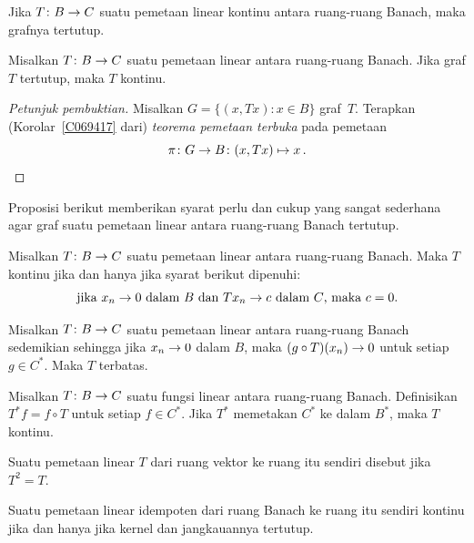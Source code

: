 \begin{exer} Jika $T\colon B \rightarrow C$ suatu pemetaan linear kontinu antara ruang-ruang Banach, maka grafnya tertutup.
\end{exer}

\begin{thm}\label{thm_CGT} Misalkan $T\colon B \rightarrow C$ suatu pemetaan linear antara ruang-ruang Banach.
Jika graf $T$ tertutup, maka $T$ kontinu.
\end{thm}

\begin{proof}[\emph{Petunjuk pembuktian}] Misalkan $G = \{(x,Tx)\colon x \in B\}$ graf~$T$. Terapkan
(Korolar~\ref{C069417} dari) \emph{teorema pemetaan terbuka} pada pemetaan
  \[ \pi\colon G \rightarrow B\colon (x,Tx) \mapsto x\,. \]
\ns \end{proof}

Proposisi berikut memberikan syarat perlu dan cukup yang sangat sederhana agar graf suatu pemetaan linear antara ruang-ruang Banach
tertutup.

\begin{prop}\label{prop_nasc_closed_graph} Misalkan $T\colon B \rightarrow C$ suatu pemetaan linear antara ruang-ruang Banach. Maka $T$
kontinu jika dan hanya jika syarat berikut dipenuhi:
   \[ \text{jika $x_n \rightarrow 0$ dalam $B$ dan $Tx_n \rightarrow c$ dalam $C$, maka $c = 0$.} \]
\end{prop}

\begin{prop} Misalkan $T \colon B \rightarrow C$ suatu pemetaan linear antara ruang-ruang Banach sedemikian sehingga jika
$x_n \rightarrow 0$ dalam $B$, maka $(g \circ T)(x_n) \rightarrow 0$ untuk setiap $g \in C^*$.  Maka $T$
terbatas.
\end{prop}

\begin{prop} Misalkan $T \colon B \rightarrow C$ suatu fungsi linear antara ruang-ruang Banach. Definisikan
$T^*f = f \circ T$ untuk setiap $f \in C^*$.  Jika $T^*$ memetakan $C^*$ ke dalam $B^*$, maka $T$
kontinu.
\end{prop}

\begin{defn}\label{C069624} Suatu pemetaan linear $T$ dari ruang vektor ke ruang itu sendiri disebut
 jika $T^2 = T$.
\end{defn}

\begin{prop}\label{prop_cont_idem_op} Suatu pemetaan linear idempoten dari ruang Banach ke ruang itu sendiri
kontinu jika dan hanya jika kernel dan jangkauannya tertutup.
\end{prop}

